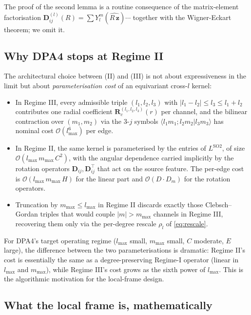 \documentclass[11pt,a4paper]{article}
\newcommand{\bz}{\bm{z}}
\newcommand{\bD}{\bm{D}}
\newcommand{\lmax}{l_{\max}}
\newcommand{\mmax}{m_{\max}}
\theoremstyle{plain}
\theoremstyle{definition}
\theoremstyle{remark}
\begin{document}
The proof of the second lemma is a routine consequence of the matrix-element
factorisation $\bD_{ij}^{(l)}(R)=\sum Y_l^m(\hat{R\,\bz})\cdots$ together with
the Wigner-Eckart theorem; we omit it.

\subsection{Why DPA4 stops at Regime II}\label{sec:why-regII}

The architectural choice between (II) and (III) is not about expressiveness in
the limit but about \emph{parameterisation cost} of an equivariant cross-$l$
kernel:

\begin{itemize}[leftmargin=2em]
    \item In Regime III, every admissible triple $(l_1,l_2,l_3)$ with $|l_1-l_2|\le
              l_3\le l_1+l_2$ contributes one radial coefficient
          $\bm{R}^{(l_1,l_2,l_3)}_c(r)$ per channel, and the bilinear contraction over
          $(m_1,m_2)$ via the 3-$j$ symbols $\langle l_1 m_1;l_2 m_2|l_3 m_3\rangle$ has
          nominal cost $\mathcal{O}(\lmax^6)$ per edge.
    \item In Regime II, the same kernel is parameterised by the entries of
          $L^{\mathrm{SO2}}$, of size $\mathcal{O}(\lmax\,\mmax\,C^2)$, with the angular
          dependence carried implicitly by the rotation operators
          $\bD_{ij},\bD_{ij}^{\top}$ that act on the source feature. The per-edge cost is
          $\mathcal{O}(\lmax\,\mmax\,H)$ for the linear part and $\mathcal{O}(D\cdot
              D_m)$ for the rotation operators.
    \item Truncation by $\mmax\le\lmax$ in Regime II discards exactly those
          Clebsch--Gordan triples that would couple $|m|>\mmax$ channels in Regime III,
          recovering them only via the per-degree rescale $\rho_l$ of \eqref{eq:rescale}.
\end{itemize}

For DPA4's target operating regime ($\lmax$ small, $\mmax$ small, $C$ moderate,
$E$ large), the difference between the two parameterisations is dramatic:
Regime II's cost is essentially the same as a degree-preserving Regime-I
operator (linear in $\lmax$ and $\mmax$), while Regime III's cost grows as the
sixth power of $\lmax$. This is the algorithmic motivation for the local-frame
design.

\subsection{What the local frame is, mathematically}\label{sec:lf-summary}
\end{document}
